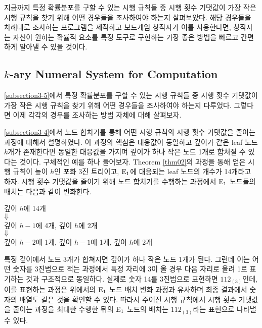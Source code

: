 \documentclass[11pt]{article}
\begin{document}
지금까지 특정 확률분포를 구할 수 있는 시행 규칙들 중 시행 횟수 기댓값이 가장 작은 시행 규칙을 찾기 위해 어떤 경우들을 조사하여야 하는지 살펴보았다. 해당 경우들을 차례대로 조사하는 프로그램을 제작하고 보드게임 창작자가 이를 사용한다면, 창작자는 자신이 원하는 확률적 요소를 특정 도구로 구현하는 가장 좋은 방법을 빠르고 간편하게 알아낼 수 있을 것이다.

\subsection{$k$-ary Numeral System for Computation}
\ref{subsection3-5}에서 특정 확률분포를 구할 수 있는 시행 규칙들 중 시행 횟수 기댓값이 가장 작은 시행 규칙을 찾기 위해 어떤 경우들을 조사하여야 하는지 다루었다. 그렇다면 이제 각각의 경우를 조사하는 방법 자체에 대해 살펴보자.

\ref{subsection3-4}에서 노드 합치기를 통해 어떤 시행 규칙의 시행 횟수 기댓값을 줄이는 과정에 대해서 설명하였다. 이 과정의 핵심은 대응값이 동일하고 깊이가 같은 leaf 노드 $k$개가 존재한다면 동일한 대응값을 가지며 깊이가 하나 작은 노드 1개로 합쳐질 수 있다는 것이다. 구체적인 예를 하나 들어보자. Theorem \ref{thm02}의 과정을 통해 얻은 시행 규칙이 높이 $h$인 포화 3진 트리이고, $\textnormal{E}_{1}$에 대응되는 leaf 노드의 개수가 14개라고 하자. 시행 횟수 기댓값을 줄이기 위해 노드 합치기를 수행하는 과정에서 $\textnormal{E}_{1}$ 노드들의 배치는 다음과 같이 변화한다.

\begin{center}
깊이 $h$에 14개\\
$\Large \Downarrow$ \\
깊이 $h-1$에 4개, 깊이 $h$에 2개\\
$\Large \Downarrow$ \\
깊이 $h-2$에 1개, 깊이 $h-1$에 1개, 깊이 $h$에 2개
\end{center}
\doublespacing

특정 깊이에서 노드 3개가 합쳐지면 깊이가 하나 작은 노드 1개가 된다. 그런데 이는 어떤 숫자를 3진법으로 적는 과정에서 특정 자리에 3이 올 경우 다음 자리로 올려 1로 표기하는 것과 구조적으로 동일하다. 실제로 숫자 14를 3진법으로 표현하면 $112_{(3)}$인데, 이를 표현하는 과정은 위에서의 $\textnormal{E}_{1}$ 노드 배치 변화 과정과 유사하며 최종 결과에서 숫자의 배열도 같은 것을 확인할 수 있다. 따라서 주어진 시행 규칙에서 시행 횟수 기댓값을 줄이는 과정을 최대한 수행한 뒤의 $\textnormal{E}_{1}$ 노드의 배치는 $112_{(3)}$라는 표현으로 나타낼 수 있다.
\end{document}
